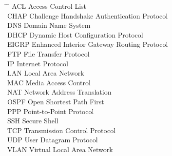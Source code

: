 \documentclass[13pt]{article}
\begin{document}
\begin{tabbing}
\hspace{1cm} \= \hspace{4cm} \= \kill
\hspace{1cm} ACL \> \hspace{4cm} Access Control List \\
\hspace{1cm} CHAP \> \hspace{4cm} Challenge Handshake Authentication Protocol \\
\hspace{1cm} DNS \> \hspace{4cm} Domain Name System \\
\hspace{1cm}  DHCP \> \hspace{4cm} Dynamic Host Configuration Protocol  \\
\hspace{1cm} EIGRP \> \hspace{4cm} Enhanced Interior Gateway Routing Protocol \\
\hspace{1cm} FTP \> \hspace{4cm} File Transfer Protocol \\
\hspace{1cm} IP \> \hspace{4cm} Internet Protocol \\
\hspace{1cm} LAN \> \hspace{4cm} Local Area Network \\
\hspace{1cm} MAC \> \hspace{4cm} Media Access Control \\
\hspace{1cm} NAT \> \hspace{4cm} Network Address Translation \\
\hspace{1cm} OSPF \> \hspace{4cm} Open Shortest Path First \\
\hspace{1cm} PPP \> \hspace{4cm} Point-to-Point Protocol \\
\hspace{1cm} SSH \> \hspace{4cm} Secure Shell \\
\hspace{1cm} TCP \> \hspace{4cm} Transmission Control Protocol \\
\hspace{1cm} UDP \> \hspace{4cm} User Datagram Protocol \\
\hspace{1cm} VLAN \> \hspace{4cm} Virtual Local Area Network \\
\end{tabbing}
\end{document}
